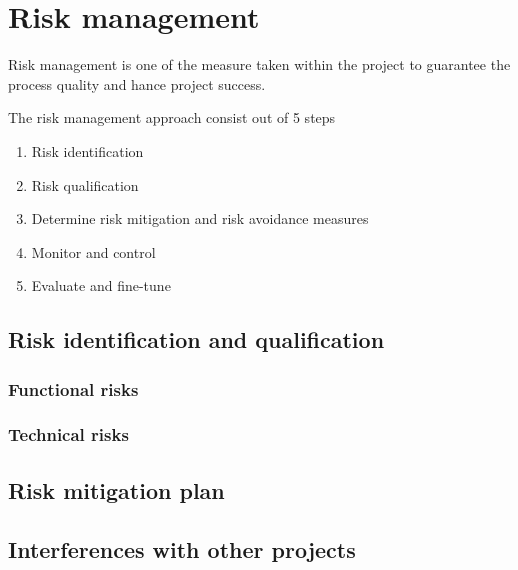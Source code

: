 \section{Risk management }
\label{sec:risk-management}
Risk management is one of the measure taken within the project to guarantee the process quality and hance project success.

The risk management approach consist out of 5 steps

\begin{enumerate}
	\item Risk identification 
	\item Risk qualification
	\item Determine risk mitigation and risk avoidance measures
	\item Monitor and control
	\item Evaluate and fine-tune
\end {enumerate}
\subsection{Risk identification and qualification}
\subsubsection{Functional risks}
\lipsum[1]
\subsubsection{Technical risks}
\lipsum[1]
\subsection{Risk mitigation plan}
\lipsum[1]

\subsection{Interferences with other projects}
\lipsum[1]